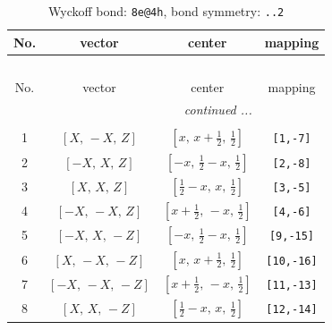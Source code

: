 \documentclass[fleqn,8pt]{jsarticle}
\begin{document}
\begin{longtable}{cccc}
\caption{Wyckoff bond: {\tt 8e@4h}, bond symmetry: {\tt ..2}}
 \\
 \hline \hline
No. & vector & center & mapping \\ \hline \endfirsthead

\multicolumn{3}{l}{\tablename\ \thetable{}} \\
 \hline \hline
No. & vector & center & mapping \\ \hline \endhead

 \hline \hline
\multicolumn{3}{r}{\footnotesize\it continued ...} \\ \endfoot

 \hline \hline
\multicolumn{3}{r}{} \\ \endlastfoot

1 & $\left[ X,\, - X,\, Z \right]$ & $\left[ x,\, x + \frac{1}{2},\, \frac{1}{2} \right]$ & {\tt [1,-7]} \\ \hline
2 & $\left[ - X,\, X,\, Z \right]$ & $\left[ - x,\, \frac{1}{2} - x,\, \frac{1}{2} \right]$ & {\tt [2,-8]} \\ \hline
3 & $\left[ X,\, X,\, Z \right]$ & $\left[ \frac{1}{2} - x,\, x,\, \frac{1}{2} \right]$ & {\tt [3,-5]} \\ \hline
4 & $\left[ - X,\, - X,\, Z \right]$ & $\left[ x + \frac{1}{2},\, - x,\, \frac{1}{2} \right]$ & {\tt [4,-6]} \\ \hline
5 & $\left[ - X,\, X,\, - Z \right]$ & $\left[ - x,\, \frac{1}{2} - x,\, \frac{1}{2} \right]$ & {\tt [9,-15]} \\ \hline
6 & $\left[ X,\, - X,\, - Z \right]$ & $\left[ x,\, x + \frac{1}{2},\, \frac{1}{2} \right]$ & {\tt [10,-16]} \\ \hline
7 & $\left[ - X,\, - X,\, - Z \right]$ & $\left[ x + \frac{1}{2},\, - x,\, \frac{1}{2} \right]$ & {\tt [11,-13]} \\ \hline
8 & $\left[ X,\, X,\, - Z \right]$ & $\left[ \frac{1}{2} - x,\, x,\, \frac{1}{2} \right]$ & {\tt [12,-14]} \\
\end{longtable}
\renewcommand{\arraystretch}{1.2}
\end{document}
